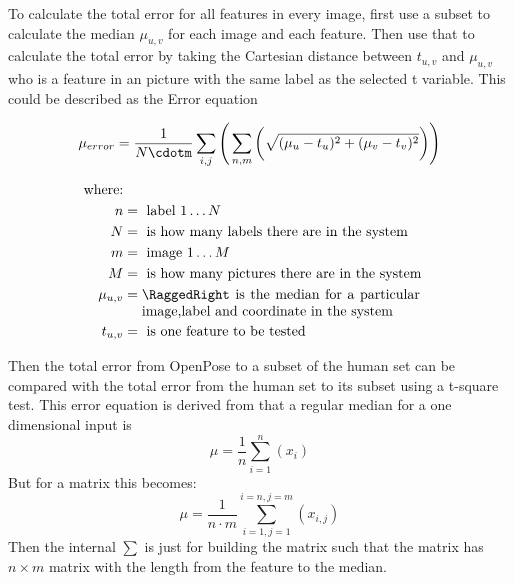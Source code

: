 \par

To calculate the total error for all features in every image, first use a subset to calculate the median \(\mu_{u,v}\) for each image and each feature.
Then use that to calculate the total error by taking the Cartesian distance between \(t_{u,v}\) and \(\mu_{u,v}\) who is a feature in an picture with the same label as the selected t variable.
This could be described as the Error equation

\begin{equation} %
\mu_{error}=\frac{1}{N\cdotm}\sum_{i,j}\Bigg(\sum_{n,m}\bigg(\sqrt{(\mu_u-t_u)^2+(\mu_v-t_v)^2}\bigg)\Bigg)
\end{equation}

\begin{align*}
    \text{where:}\\
    n &= \text{ label } 1\dots N\\
    N &= \text{ is how many labels there are in the system}\\
    m &= \text{ image } 1\dots M\\
    M &= \text{ is how many pictures there are in the system}\\
    \mu_{u,v} &= \parbox[t]{7cm}{\RaggedRight is the median for a particular image,label and coordinate in the system}\\
    t_{u,v} &= \text{ is one feature to be tested}
\end{align*}
\par
Then the total error from OpenPose to a subset of the human set can be compared with the total error from the human set to its subset using a t-square test.
This error equation is derived from that a regular median for a one dimensional input is
\[
\mu = \frac{1}{n}\sum_{i=1}^n (x_i)
\]
But for a matrix this becomes:
\[
\mu = \frac{1}{n\cdot m} \sum_{i=1,j=1}^{i=n,j=m}(x_{i,j})
\]
Then the internal \(\sum\) is just for building the matrix such that the matrix has \(n\times m\) matrix with the length from the feature to the median.






